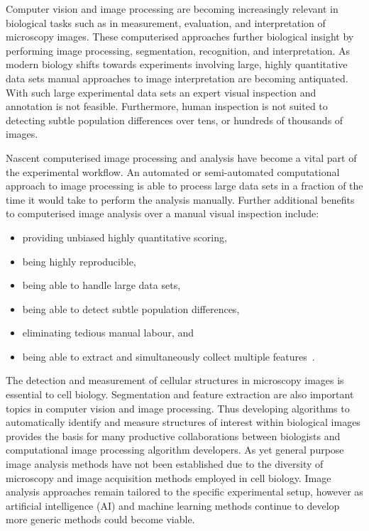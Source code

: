 Computer vision and image processing are becoming increasingly relevant in biological tasks such as in measurement, evaluation, and interpretation of microscopy images. These computerised approaches further biological insight by performing image processing, segmentation, recognition, and interpretation. As modern biology shifts towards experiments involving large, highly quantitative data sets manual approaches to image interpretation are becoming antiquated. With such large experimental data sets an expert visual inspection and annotation is not feasible. Furthermore, human inspection is not suited to detecting subtle population differences over tens, or hundreds of thousands of images.

Nascent computerised image processing and analysis have become a vital part of the experimental workflow. An automated or semi-automated computational approach to image processing is able to process large data sets in a fraction of the time it would take to perform the analysis manually. Further additional benefits to computerised image analysis over a manual visual inspection include:
\begin{itemize}
\item providing unbiased highly quantitative scoring,
\item being highly reproducible,
\item being able to handle large data sets,
\item being able to detect subtle population differences,
\item eliminating tedious manual labour, and
\item being able to extract and simultaneously collect multiple features~\cite{Jones2006}.
\end{itemize}

The detection and measurement of cellular structures in microscopy images is essential to cell biology. Segmentation and feature extraction are also important topics in computer vision and image processing. Thus developing algorithms to automatically identify and measure structures of interest within biological images provides the basis for many productive collaborations between biologists and computational image processing algorithm developers. As yet general purpose image analysis methods have not been established due to the diversity of microscopy and image acquisition methods employed in cell biology. Image analysis approaches remain tailored to the specific experimental setup, however as artificial intelligence (AI) and machine learning methods continue to develop more generic methods could become viable.

